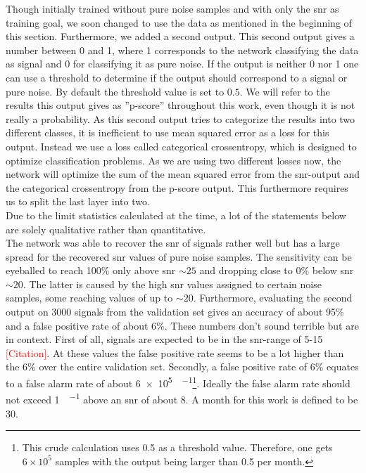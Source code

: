 Though initially trained without pure noise samples and with only the \gls{snr} as training goal, we soon changed to use the data as mentioned in the beginning of this section. Furthermore, we added a second output. This second output gives a number between 0 and 1, where 1 corresponds to the network classifying the data as signal and 0 for classifying it as pure noise. If the output is neither 0 nor 1 one can use a threshold to determine if the output should correspond to a signal or pure noise. By default the threshold value is set to $0.5$. We will refer to the results this output gives as ''p-score'' throughout this work, even though it is not really a probability. As this second output tries to categorize the results into two different classes, it is inefficient to use mean squared error as a loss for this output. Instead we use a loss called categorical crossentropy, which is designed to optimize classification problems. As we are using two different losses now, the network will optimize the sum of the mean squared error from the \gls{snr}-output and the categorical crossentropy from the p-score output. This furthermore requires us to split the last layer into two.\\
Due to the limit statistics calculated at the time, a lot of the statements below are solely qualitative rather than quantitative.\\
The network was able to recover the \gls{snr} of signals rather well but has a large spread for the recovered \gls{snr} values of pure noise samples. The sensitivity can be eyeballed to reach 100\% only above \gls{snr} $\sim 25$ and dropping close to 0\% below \gls{snr} $\sim 20$. The latter is caused by the high \gls{snr} values assigned to certain noise samples, some reaching values of up to $\sim 20$. Furthermore, evaluating the second output on 3000 signals from the validation set gives an accuracy of about 95\% and a false positive rate of about 6\%. These numbers don't sound terrible but are in context. First of all, signals are expected to be in the \gls{snr}-range of 5-15 \textcolor{red}{[Citation]}. At these values the false positive rate seems to be a lot higher than the 6\% over the entire validation set. Secondly, a false positive rate of 6\% equates to a false alarm rate of about \SI[per-mode=fraction]{6e5}{\samples\per\month}\footnote{This crude calculation uses 0.5 as a threshold value. Therefore, one gets $6\times 10^5$ samples with the output being larger than 0.5 per month.}. Ideally the false alarm rate should not exceed \SI[per-mode=fraction]{1}{\sample\per\month} above an \gls{snr} of about $8$. A month for this work is defined to be \SI{30}{\days}.\medskip\\
